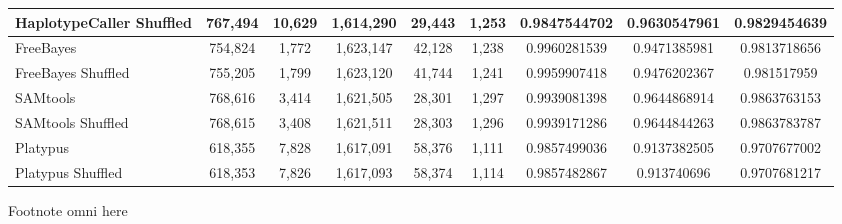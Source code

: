 \begin{table}[htb]
\begin{center}
\begin{tabular}{|l||c|c|c|c|c|c|c|c|}
\hline
HaplotypeCaller Shuffled & 767,494 & 10,629 & 1,614,290 & 29,443 & 1,253 & 0.9847544702 & 0.9630547961 & 0.9829454639 \\
\hline
FreeBayes & 754,824 & 1,772 & 1,623,147 & 42,128 & 1,238 & 0.9960281539 & 0.9471385981 & 0.9813718656 \\
\hline
FreeBayes Shuffled & 755,205 & 1,799 & 1,623,120 & 41,744 & 1,241 & 0.9959907418 & 0.9476202367 & 0.981517959 \\
\hline
SAMtools & 768,616 & 3,414 & 1,621,505 & 28,301 & 1,297 & 0.9939081398 & 0.9644868914 & 0.9863763153 \\
\hline
SAMtools Shuffled & 768,615 & 3,408 & 1,621,511 & 28,303 & 1,296 & 0.9939171286 & 0.9644844263 & 0.9863783787 \\
\hline
Platypus & 618,355 & 7,828 & 1,617,091 & 58,376 & 1,111 & 0.9857499036 & 0.9137382505 & 0.9707677002 \\
\hline
Platypus Shuffled & 618,353 & 7,826 & 1,617,093 & 58,374 & 1,114 & 0.9857482867 & 0.913740696 & 0.9707681217 \\
\hline
\end{tabular}
\end{center}
{\footnotesize Footnote omni here}
\label{supptab:orig-vs-shuf-hc}
\end{table}



